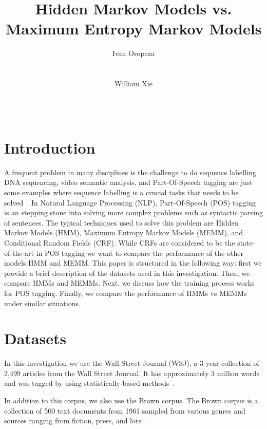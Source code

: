 \documentclass{acm_proc_article-sp}
\begin{document}
\author{
\alignauthor
Ivan Oropeza\\
       \\
       \\
\alignauthor
William Xie\\
       \\
       \\
}

\title{Hidden Markov Models vs. Maximum Entropy Markov Models}


\maketitle
\section{Introduction}
A frequent problem in many disciplines is the challenge to do sequence labelling. DNA sequencing, video semantic analysis, and Part-Of-Speech tagging are just some examples where sequence labelling is a crucial tasks that needs to be solved~\cite{dnaEx, videoEx, nlpEx}. In Natural Language Processing (NLP), Part-Of-Speech (POS) tagging is an stepping stone into solving more complex problems such as syntactic parsing of sentences. The typical techniques used to solve this problem are Hidden Markov Models (HMM), Maximum Entropy Markov Models (MEMM), and Conditional Random Fields (CRF). While CRFs are considered to be the state-of-the-art in POS tagging we want to compare the performance of the other models HMM and MEMM. This paper is structured in the following way: first we provide a brief description of the datasets used in this investigation. Then, we compare HMMs and MEMMs. Next, we discuss how the training process works for POS tagging. Finally, we compare the performance of HMMs vs MEMMs under similar situations.
\section{Datasets}
In this investigation we use the Wall Street Journal (WSJ), a 3-year collection of 2,499 articles from the Wall Street Journal. It has approximately 3 million words and was tagged by using statistically-based methods~\cite{wsjCorpus}. 

In addition to this corpus, we also use the Brown corpus. The Brown corpus is a collection of 500 text documents from 1961 sampled from various genres and sources ranging from fiction, press, and lore~\cite{brownCorpus}.
\end{document}
